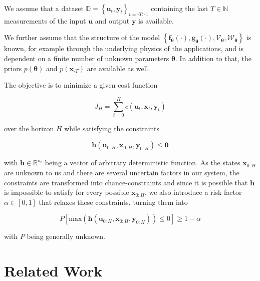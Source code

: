We assume that a dataset $\mathbb{D} = \left\{\boldsymbol{u}_{t}, \boldsymbol{y}_{t}\right\}_{t = \text{-}T:\text{-}1}$ containing the last $T \in \mathbb{N}$ measurements of the input $\boldsymbol{u}$ and output $\boldsymbol{y}$ is available.

We further assume that the structure of the model $\left\{\boldsymbol{f}_{\boldsymbol{\theta}}(\cdot), \boldsymbol{g}_{\boldsymbol{\theta}}(\cdot), \boldsymbol{\mathcal{V}}_{\boldsymbol{\theta}}, \boldsymbol{\mathcal{W}}_{\boldsymbol{\theta}}\right\}$ is known, for example through the underlying physics of the applications, and is dependent on a finite number of unknown parameters $\boldsymbol{\theta}$. In addition to that, the priors $p(\boldsymbol{\theta})$ and $p(\boldsymbol{x}_{\text{-}T})$ are available as well.

The objective is to minimize a given cost function 

\begin{equation} \label{cost function}
J_H = \sum_{t = 0}^H c(\boldsymbol{u}_t,  \boldsymbol{x}_t,  \boldsymbol{y}_t)
\end{equation}

over the horizon $H$ while satisfying the constraints 

\begin{equation} \label{constraints}
\boldsymbol{h}(\boldsymbol{u}_{0:H},  \boldsymbol{x}_{0:H},  \boldsymbol{y}_{0:H}) \leq \boldsymbol{0}
\end{equation}

with $\boldsymbol{h} \in \mathbb{R}^{n_c}$ being a vector of arbitrary deterministic function. As the states $\boldsymbol{x}_{0:H}$ are unknown to us and there are several uncertain factors in our system, the constraints are transformed into chance-constraints and since it is possible that $\boldsymbol{h}$ is impossible to satisfy for every possible $\boldsymbol{x}_{0:H}$, we also introduce a risk factor $\alpha \in [0, 1]$ that relaxes these constraints, turning them into

\begin{equation} \label{risk constraints}
P \left[ \text{max} (\boldsymbol{h}(\boldsymbol{u}_{0:H},  \boldsymbol{x}_{0:H},  \boldsymbol{y}_{0:H})) \leq 0 \right] \geq 1 - \alpha
\end{equation}

with $P$ being generally unknown.

\section{Related Work} \label{Related Work}

